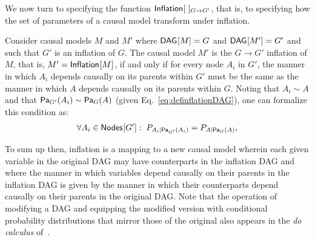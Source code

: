 We now turn to specifying the function $\SmallNamedFunction{Inflation}\;_{G\to G'}$, that is, to specifying how the set of parameters of a causal model transform under inflation. 
\begin{definition}
Consider causal models $M$ and $M'$ where $\SmallNamedFunction{DAG}{M}=G$ and $\SmallNamedFunction{DAG}{M'}=G'$ and such that $G'$ is an inflation of $G$.   The causal model $M'$ is the $G\to G'$ inflation of $M$, that is, $M' = \SmallNamedFunction{Inflation}{M}$,  if and only if for every node $A_i$ in $G'$, the manner in which $A_i$ depends causally on its parents within $G'$ must be the same as the manner in which $A$ depends causally on its parents within $G$.  Noting that $A_i \sim A$ and that $\Pa[G']{A_i} \sim \Pa[G]{A}$ (given Eq.~\eqref{eq:definflationDAG}), one can formalize this condition as:
\begin{align}\label{eq:funcdependences}
 \forall A_i \in \SmallNamedFunction{Nodes}{G'}:\; \pfunc{A_i| \Pa[G']{A_i}}=\pfunc{A|\Pa[G]{A}},
\end{align}
\end{definition}

To sum up then, inflation is a mapping to a new causal model wherein each given variable in the original DAG may have counterparts in the inflation DAG and where the manner in which variables depend causally on their parents in the inflation DAG is given by the manner in which their counterparts depend causally on their parents in the original DAG.   Note that the operation of modifying a DAG and equipping the modified version with conditional probability distributions that mirror those of the original also appears in the \emph{do calculus} of~\citet{pearl2009causality}. 


